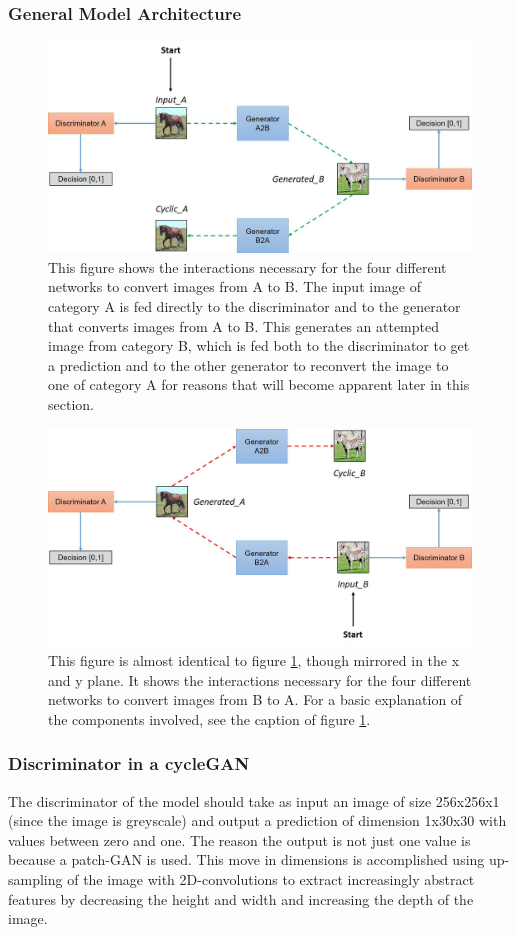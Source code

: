 \documentclass[12pt, fleqn, titlepage]{article}
\begin{document}
\subsubsection{General Model Architecture}
\begin{figure}[H]
	\centering
	\includegraphics[width=0.7\linewidth]{imgs/cyclegan_architecture}
	\caption{This figure shows the interactions necessary for the four different networks to convert images from A to B. The input image of category A is fed directly to the discriminator and to the generator that converts images from A to B. This generates an attempted image from category B, which is fed both to the discriminator to get a prediction and to the other generator to reconvert the image to one of category A for reasons that will become apparent later in this section.}
	\label{fig:cycleganarchitecture}
\end{figure}

\begin{figure}[H]
	\centering
	\includegraphics[width=0.7\linewidth]{imgs/cyclegan_architecture2}
	\caption{This figure is almost identical to figure \ref{fig:cycleganarchitecture}, though mirrored in the x and y plane. It shows the interactions necessary for the four different networks to convert images from B to A. For a basic explanation of the components involved, see the caption of figure \ref{fig:cycleganarchitecture}.}
	\label{fig:cycleganarchitecture2}
\end{figure}


\subsubsection{Discriminator in a cycleGAN}
The discriminator of the model should take as input an image of size 256x256x1 (since the image is greyscale) and output a prediction of dimension 1x30x30 with values between zero and one. The reason the output is not just one value is because a patch-GAN is used. This move in dimensions is accomplished using up-sampling of the image with 2D-convolutions to extract increasingly abstract features by decreasing the height and width and increasing the depth of the image.
\end{document}
